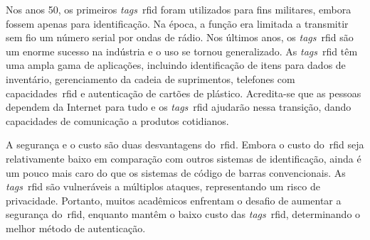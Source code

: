 Nos anos 50, os primeiros \textit{tags}~\acrshort{rfid} foram utilizados para
fins militares, embora fossem apenas para identificação.
Na época, a função era limitada a transmitir sem fio um número serial
por ondas de rádio.
Nos últimos anos, os \textit{tags}~\acrshort{rfid} são um enorme sucesso na
indústria e o uso se tornou generalizado.
As \textit{tags}~\acrshort{rfid} têm uma ampla gama de aplicações, incluindo
identificação de itens para dados de inventário, gerenciamento da cadeia de
suprimentos, telefones com capacidades~\acrshort{rfid} e autenticação de cartões
de plástico.
Acredita-se que as pessoas dependem da Internet para tudo e os \textit{tags}~\acrshort{rfid}
ajudarão nessa transição, dando capacidades de comunicação a produtos
cotidianos\cite{idrus2013}.

A segurança e o custo são duas desvantagens do~\acrshort{rfid}.
Embora o custo do~\acrshort{rfid} seja relativamente baixo em comparação com
outros sistemas de identificação, ainda é um pouco mais caro do que os sistemas
de código de barras convencionais.
As \textit{tags}~\acrshort{rfid} são vulneráveis a múltiplos ataques,
representando
um risco de privacidade.
Portanto, muitos acadêmicos enfrentam o desafio de aumentar a segurança do~\acrshort{rfid},
enquanto mantêm o baixo custo das \textit{tags}~\acrshort{rfid}, determinando o
melhor método de autenticação\cite{jadhao2018}.